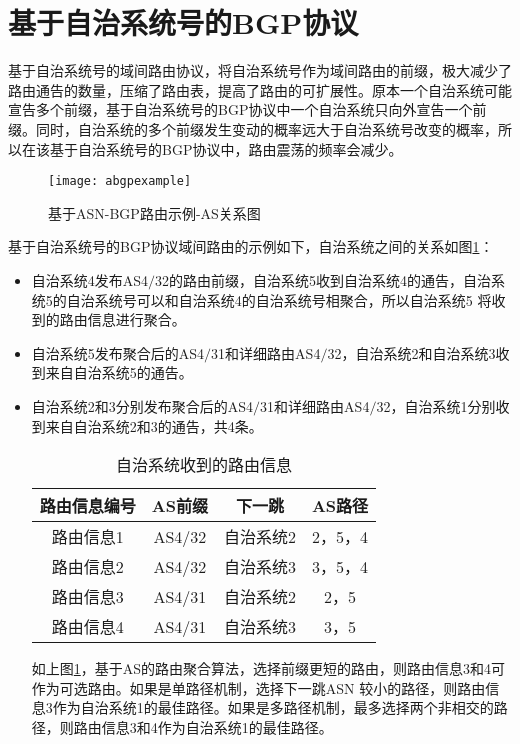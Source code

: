 \section{基于自治系统号的BGP协议}

基于自治系统号的域间路由协议，将自治系统号作为域间路由的前缀，极大减少了路由通告的数量，压缩了路由表，提高了路由的可扩展性。原本一个自治系统可能宣告多个前缀，基于自治系统号的BGP协议中一个自治系统只向外宣告一个前缀。同时，自治系统的多个前缀发生变动的概率远大于自治系统号改变的概率，所以在该基于自治系统号的BGP协议中，路由震荡的频率会减少。

\begin{figure}
  \centering
  \texttt{[image: abgpexample]}
  \caption{基于ASN-BGP路由示例-AS关系图}
  \label{fig:abgpexample}
\end{figure}


基于自治系统号的BGP协议域间路由的示例如下，自治系统之间的关系如图\ref{fig:abgpexample}：

\begin{itemize}
\item 自治系统4发布AS4$/$32的路由前缀，自治系统5收到自治系统4的通告，自治系统5的自治系统号可以和自治系统4的自治系统号相聚合，所以自治系统5 将收到的路由信息进行聚合。
\item 自治系统5发布聚合后的AS4$/$31和详细路由AS4$/$32，自治系统2和自治系统3收到来自自治系统5的通告。
\item 自治系统2和3分别发布聚合后的AS4$/$31和详细路由AS4$/$32，自治系统1分别收到来自自治系统2和3的通告，共4条。

\begin{table}[h]
    \centering
    \caption{自治系统收到的路由信息}
    \label{tab:oneroutinginfo}
        \begin{tabular}{|c|c|c|c|}
        \hline
            路由信息编号 & AS前缀 & 下一跳 & AS路径\\ \hline
            路由信息1 & AS4$/$32 & 自治系统2 & 2，5，4\\ \hline
            路由信息2 & AS4$/$32 & 自治系统3 & 3，5，4\\ \hline
            路由信息3 & AS4$/$31 & 自治系统2 & 2，5\\ \hline
            路由信息4 & AS4$/$31 & 自治系统3 & 3，5\\
        \hline
        \end{tabular}
\end{table}
    如上图\ref{tab:oneroutinginfo}，基于AS的路由聚合算法，选择前缀更短的路由，则路由信息3和4可作为可选路由。如果是单路径机制，选择下一跳ASN 较小的路径，则路由信息3作为自治系统1的最佳路径。如果是多路径机制，最多选择两个非相交的路径，则路由信息3和4作为自治系统1的最佳路径。

\end{itemize}


